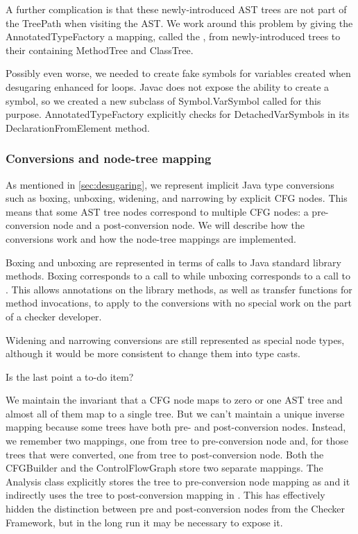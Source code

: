 A further complication is that these newly-introduced AST trees are
not part of the TreePath when visiting the AST.  We work around this
problem by giving the AnnotatedTypeFactory a mapping, called the
, from newly-introduced trees to their containing
MethodTree and ClassTree.

Possibly even worse, we needed to create fake symbols for variables
created when desugaring enhanced for loops.  Javac does not expose the
ability to create a symbol, so we created a new subclass of
Symbol.VarSymbol called  for
this purpose.  AnnotatedTypeFactory explicitly checks for
DetachedVarSymbols in its DeclarationFromElement method.



\subsubsection{Conversions and node-tree mapping}
\label{sec:conversions}

As mentioned in \autoref{sec:desugaring}, we represent implicit Java
type conversions such as boxing, unboxing, widening, and narrowing by
explicit CFG nodes.  This means that some AST tree nodes correspond to
multiple CFG nodes: a pre-conversion node and a post-conversion node.
We will describe how the conversions work and how the node-tree
mappings are implemented.

Boxing and unboxing are represented in terms of calls to Java standard
library methods.  Boxing corresponds to a call to
 while unboxing corresponds to a call to
.  This allows annotations on the library
methods, as well as transfer functions for method invocations, to
apply to the conversions with no special work on the part of a checker
developer.

Widening and narrowing conversions are still represented as special
node types, although it would be more consistent to change them into
type casts.

\begin{workinprogress}
Is the last point a to-do item?
\end{workinprogress}

We maintain the invariant that a CFG node maps to zero or one AST tree
and almost all of them map to a single tree.  But we can't maintain a
unique inverse mapping because some trees have both pre- and
post-conversion nodes.  Instead, we remember two mappings, one from
tree to pre-conversion node and, for those trees that were converted,
one from tree to post-conversion node.  Both the CFGBuilder and the
ControlFlowGraph store two separate mappings.  The Analysis class
explicitly stores the tree to pre-conversion node mapping as
 and it indirectly uses the tree to post-conversion
mapping in .  This has effectively
hidden the distinction between pre and post-conversion nodes from the
Checker Framework, but in the long run it may be necessary to expose
it.




